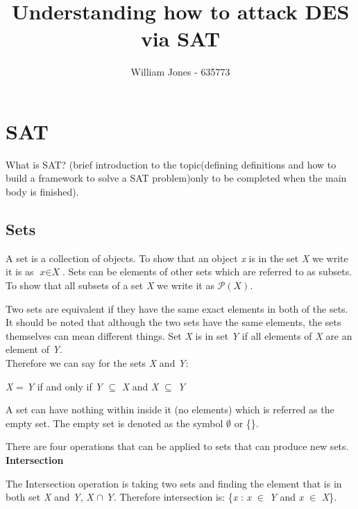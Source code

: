 \documentclass[11pt,a4paper]{article}
\author{William Jones - 635773}
\begin{document}
\title{Understanding how to attack DES via SAT}
\maketitle
\thispagestyle{empty}
\setcounter{page}{1}
\newpage
\tableofcontents
\clearpage


\section{SAT}
What is SAT? (brief introduction to the topic(defining definitions and how to build a framework to solve a SAT problem)only to be completed when the main body is finished).
\newline

\subsection{Sets}
A set is a collection of objects. To show that an object \textit{x} is in the set \textit{X} we write it is as $\textit{x} \in \textit{X}$. Sets can be elements of other sets which are referred to as subsets. To show that all subsets of a set \textit{X} we write it as $\mathcal{P}(\textit{X})$. \newline

\noindent Two sets are equivalent if they have the same exact elements in both of the sets. It should be noted that although the two sets have the same elements, the sets themselves can mean different things. Set \textit{X} is in set \textit{Y} if all elements of \textit{X} are an element of \textit{Y}.\\
Therefore we can say for the sets \textit{X} and \textit{Y}:

\begin{center}
{\textit{X} = \textit{Y} if and only if \textit{Y} $\subseteq$ \textit{X} and \textit{X} $\subseteq$ \textit{Y}}
\end{center}

\noindent A set can have nothing within inside it (no elements) which is referred as the empty set. The empty set is denoted as the symbol $\emptyset$ or \{\}.\newline

\noindent There are four operations that can be applied to sets that can produce new sets. \newline \newline
\textbf{Intersection} 

\indent The Intersection operation is taking two sets and finding the element that is in both set \textit{X} and \textit{Y}, \textit{X} $\cap$ \textit{Y}. Therefore intersection is: \{\textit{x} : \textit{x} $\in$ \textit{Y} and \textit{x} $\in$ \textit{X}\}. \newline
\end{document}
